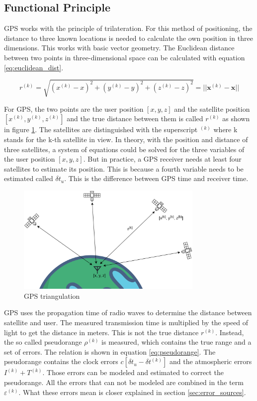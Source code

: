 \subsection{Functional Principle}

GPS works with the principle of trilateration.
For this method of positioning, the distance to three known locations is needed to calculate the own position in three dimensions.
This works with basic vector geometry.
The Euclidean distance between two points in three-dimensional space can be calculated with equation \ref{eq:euclidean_dist}.

\begin{equation}
 r^{(k)} = \sqrt{(x^{(k)} - x)^2 + (y^{(k)} - y)^2 + (z^{(k)} - z)^2} = \lvert\lvert \textbf{x}^{(k)} - \textbf{x} \rvert\rvert		\label{eq:euclidean_dist}
\end{equation}

For GPS, the two points are the user position $[x, y, z]$ and the satellite position $[x^{(k)}, y^{(k)}, z^{(k)}]$ and the true distance between them is called $r^{(k)}$ as shown in figure \ref{fig:triangulation}.
The satellites are distinguished with the superscript $^{(k)}$ where k stands for the k-th satellite in view.
In theory, with the position and distance of three satellites, a system of equations could be solved for the three variables of the user position $[x, y, z]$.
But in practice, a GPS receiver needs at least four satellites to estimate its position.
This is because a fourth variable needs to be estimated called $\delta t_u$.
This is the difference between GPS time and receiver time.

\begin{figure}[ht]
 \centering
 \includegraphics[width=0.8\textwidth]{images/Position_Estimation.png}
 \caption{GPS triangulation}
 \label{fig:triangulation}
\end{figure}

GPS uses the propagation time of radio waves to determine the distance between satellite and user.
The measured transmission time is multiplied by the speed of light to get the distance in meters.
This is not the true distance $r^{(k)}$.
Instead, the so called pseudorange $\rho^{(k)}$ is measured, which contains the true range and a set of errors.
The relation is shown in equation \ref{eq:pseudorange}.
The pseudorange contains the clock errors $c[\delta t_u - \delta t^{(k)}]$ and the atmospheric errors $I^{(k)} + T^{(k)}$.
Those errors can be modeled and estimated to correct the pseudorange.
All the errors that can not be modeled are combined in the term $\varepsilon^{(k)}$.
What these errors mean is closer explained in section \ref{sec:error_sources}.


